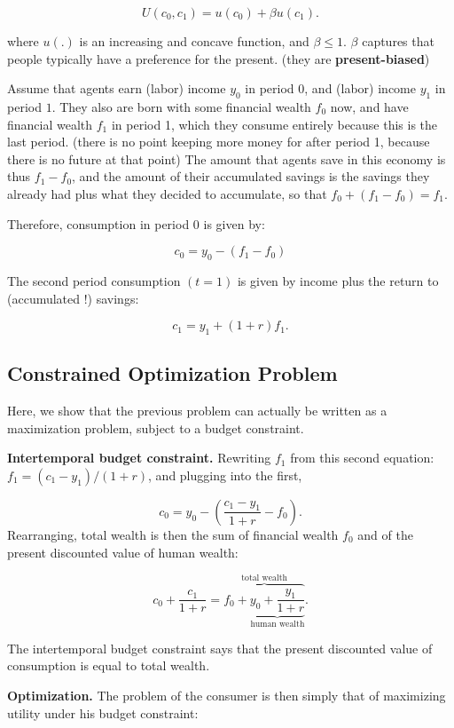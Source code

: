 \documentclass[]{book}
\begin{document}
\[U(c_{0},c_{1})=u(c_{0})+\beta u(c_{1}).\]

where \(u(.)\) is an increasing and concave function, and
\(\beta \leq 1\). \(\beta\) captures that people typically have a
preference for the present. (they are \textbf{present-biased})

Assume that agents earn (labor) income \(y_{0}\) in period \(0\), and
(labor) income \(y_{1}\) in period \(1\). They also are born with some
financial wealth \(f_{0}\) now, and have financial wealth \(f_{1}\) in
period 1, which they consume entirely because this is the last period.
(there is no point keeping more money for after period 1, because there
is no future at that point) The amount that agents save in this economy
is thus \(f_{1}-f_{0}\), and the amount of their accumulated savings is
the savings they already had plus what they decided to accumulate, so
that \(f_{0}+(f_{1}-f_{0})=f_{1}.\)

Therefore, consumption in period \(0\) is given by:

\[c_{0} =y_{0}-(f_{1}-f_{0})\]

The second period consumption \((t=1)\) is given by income plus the
return to (accumulated !) savings:

\[c_{1} =y_{1}+(1+r)f_{1}.\]

\subsection{Constrained Optimization
Problem}\label{constrained-optimization-problem}

Here, we show that the previous problem can actually be written as a
maximization problem, subject to a budget constraint.

\textbf{Intertemporal budget constraint.} Rewriting \(f_{1}\) from this
second equation: \(f_{1}=(c_{1}-y_{1})/(1+r)\), and plugging into the
first,

\[c_{0}=y_{0}-\left(\frac{c_{1}-y_{1}}{1+r}-f_{0}\right).\] Rearranging,
total wealth is then the sum of financial wealth \(f_0\) and of the
present discounted value of human wealth:

\[c_{0}+\frac{c_{1}}{1+r}=\overbrace{f_{0}+\underbrace{y_{0}+\frac{y_{1}}{1+r}}_{\text{human wealth}}}^{\text{total wealth}}.\]

The intertemporal budget constraint says that the present discounted
value of consumption is equal to total wealth.

\textbf{Optimization.} The problem of the consumer is then simply that
of maximizing utility under his budget constraint:
\end{document}
